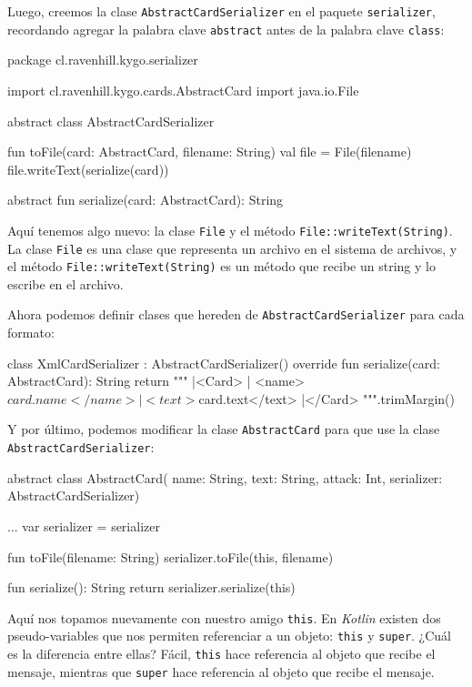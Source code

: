   Luego, creemos la clase \texttt{AbstractCardSerializer} en el paquete \texttt{serializer}, 
  recordando agregar la palabra clave \texttt{abstract} antes de la palabra clave \texttt{class}:

  \begin{kotlin}
    package cl.ravenhill.kygo.serializer

    import cl.ravenhill.kygo.cards.AbstractCard
    import java.io.File


    abstract class AbstractCardSerializer {
      fun toFile(card: AbstractCard, filename: String) {
        val file = File(filename)
        file.writeText(serialize(card))
      }

      abstract fun serialize(card: AbstractCard): String
    }
  \end{kotlin}

  Aquí tenemos algo nuevo: la clase \texttt{File} y el método \texttt{File::writeText(String)}.
  La clase \texttt{File} es una clase que representa un archivo en el sistema de archivos, y el
  método \texttt{File::writeText(String)} es un método que recibe un string y lo escribe en el
  archivo.

  Ahora podemos definir clases que hereden de \texttt{AbstractCardSerializer} para cada formato:

  \begin{kotlin}
    class XmlCardSerializer : AbstractCardSerializer() {
      override fun serialize(card: AbstractCard): String {
        return """
          |<Card>
          |  <name>${card.name}</name>
          |  <text>${card.text}</text>
          |</Card>
        """.trimMargin()
      }
    }
  \end{kotlin}



  Y por último, podemos modificar la clase \texttt{AbstractCard} para que use la clase
  \texttt{AbstractCardSerializer}:

  \begin{kotlin}
    abstract class AbstractCard(
      name: String, text: String, attack: Int, 
      serializer: AbstractCardSerializer) {
      ...
      var serializer = serializer

      fun toFile(filename: String) {
        serializer.toFile(this, filename)
      }

      fun serialize(): String {
        return serializer.serialize(this)
      }
    }
  \end{kotlin}

  Aquí nos topamos nuevamente con nuestro amigo \texttt{this}.
  En \textit{Kotlin} existen dos pseudo-variables que nos permiten referenciar a un objeto: 
  \texttt{this} y \texttt{super}.
  ¿Cuál es la diferencia entre ellas?
  Fácil, \texttt{this} hace referencia al objeto que recibe el mensaje, mientras que \texttt{super}
  hace referencia al objeto que recibe el mensaje.

